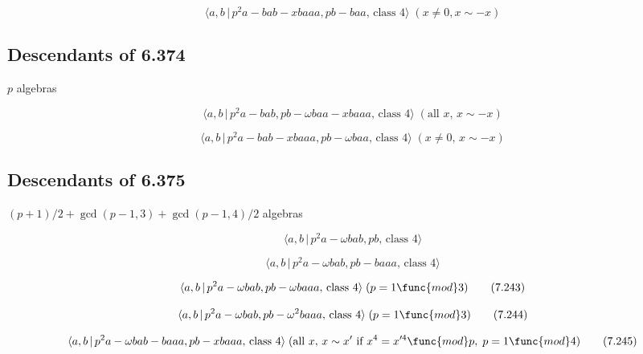 \documentclass[10pt]{article}
\begin{document}
\begin{equation}
\langle a,b\,|\,p^2a-bab-xbaaa,pb-baa,\,\text{class }4\rangle \;(x \neq 0, x
\sim -x)  \tag{7.238}
\end{equation}

\subsection{Descendants of 6.374}

$p$ algebras

\begin{equation}
\langle a,b\,|\,p^{2}a-bab,pb-\omega baa-xbaaa,\,\text{class }4\rangle \;(%
\text{all }x,\,x\sim -x)  \tag{7.239}
\end{equation}

\begin{equation}
\langle a,b\,|\,p^{2}a-bab-xbaaa,pb-\omega baa,\,\text{class }4\rangle
\;(x\neq 0,\,x\sim -x)  \tag{7.240}
\end{equation}

\subsection{Descendants of 6.375}

$(p+1)/2+\gcd (p-1,3)+\gcd (p-1,4)/2$ algebras

\begin{equation}
\langle a,b\,|\,p^{2}a-\omega bab,pb,\,\text{class }4\rangle  \tag{7.241}
\end{equation}

\begin{equation}
\langle a,b\,|\,p^{2}a-\omega bab,pb-baaa,\,\text{class }4\rangle 
\tag{7.242}
\end{equation}

\begin{equation}
\langle a,b\,|\,p^{2}a-\omega bab,pb-\omega baaa,\,\text{class }4\rangle
\;(p=1\func{mod}3)  \tag{7.243}
\end{equation}

\begin{equation}
\langle a,b\,|\,p^{2}a-\omega bab,pb-\omega ^{2}baaa,\,\text{class }4\rangle
\;(p=1\func{mod}3)  \tag{7.244}
\end{equation}

\begin{equation}
\langle a,b\,|\,p^{2}a-\omega bab-baaa,pb-xbaaa,\,\text{class }4\rangle \;(%
\text{all }x,\,x\sim x^{\prime }\text{ if }x^{4}=x^{\prime 4}\func{mod}%
p,\;p=1\func{mod}4)  \tag{7.245}
\end{equation}
\end{document}
